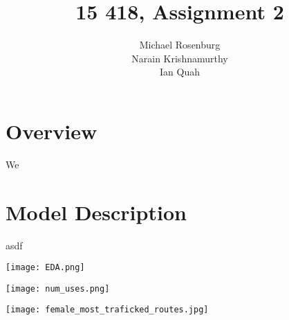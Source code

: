 \documentclass{article}
\title{15 418, Assignment 2}
\author{Michael Rosenburg \\ Narain Krishnamurthy \\ Ian Quah}
\begin{document}
\maketitle

\section{Overview}
We 

\section{Model Description}
asdf

\texttt{[image: EDA.png]}

\texttt{[image: num\_uses.png]}

\texttt{[image: female\_most\_traficked\_routes.jpg]}
\end{document}
